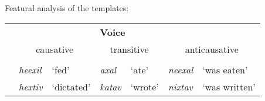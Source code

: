 \ex\label{ex:alternations-heb2}Featural analysis of the templates:\\
	\begin{tabular}{cll|ll|ll}
	& \multicolumn{2}{P{4cm}|}{\textbf{\vd}}	&	\multicolumn{2}{P{4cm}|}{\textbf{Voice}}	& \multicolumn{2}{P{4cm}}{\textbf{\vz}}\\
	\phantom{Semantics} & \multicolumn{2}{c|}{causative} &	\multicolumn{2}{c|}{transitive}	& \multicolumn{2}{c}{anticausative}\\\cline{2-7}
	& \multicolumn{2}{c|}{\thif}	&	\multicolumn{2}{c|}{\tkal}	& \multicolumn{2}{c}{\tnif}\\
	& \emph{heexil}	& `fed' &	\emph{axal}	& `ate'	&	\emph{neexal}	& `was eaten' \\
	& \emph{hextiv}	& `dictated' &	\emph{katav}	& `wrote'	&	\emph{nixtav}	& `was written' \\
	\end{tabular}
\xe




